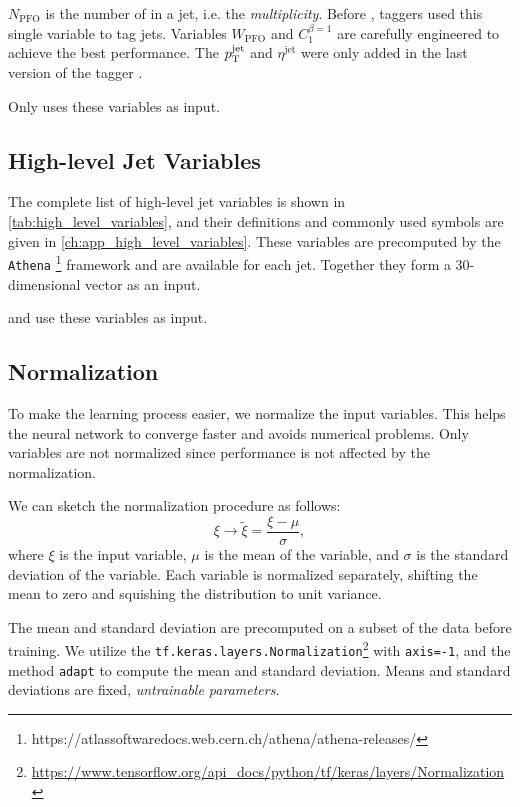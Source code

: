 $N_\mathrm{PFO}$ is the number of \PFOs in a jet, i.e. the \emph{multiplicity}.
Before \bdt, taggers used this single variable to tag jets. 
Variables $W_\mathrm{PFO}$ and $C_1^{\beta = 1}$ are carefully engineered to achieve the best performance.
The $p_\text{T}^{\text{jet}}$ and $\eta^\mathrm{jet}$ were only added in the last version of the tagger \cite{bdt_tag}.

Only \bdt uses these variables as input.

\subsection{High-level Jet Variables}
\label{sec:high_level_variables}

The complete list of high-level jet variables is shown in \cref{tab:high_level_variables}, and their definitions and commonly used symbols are given in \cref{ch:app_high_level_variables}.
These variables are precomputed by the \texttt{Athena} \footnote{https://atlassoftwaredocs.web.cern.ch/athena/athena-releases/} framework and are available for each jet.
Together they form a 30-dimensional vector as an input.

\fc and \highway use these variables as input.

\subsection{Normalization}
\label{sec:input_normalization}
To make the learning process easier, we normalize the input variables.
This helps the neural network to converge faster and avoids numerical problems.
Only \bdt variables are not normalized since \bdt performance is not affected by the normalization.

We can sketch the normalization procedure as follows:
\begin{equation}
    \xi \rightarrow \tilde{\xi} = \frac{\xi - \mu}{\sigma},
\end{equation}
where $\xi$ is the input variable, $\mu$ is the mean of the variable, and $\sigma$ is the standard deviation of the variable.
Each variable is normalized separately, shifting the mean to zero and squishing the distribution to unit variance.

The mean and standard deviation are precomputed on a subset of the data before training.
We utilize the \texttt{tf.keras.layers.Normalization}\footnote{\url{https://www.tensorflow.org/api_docs/python/tf/keras/layers/Normalization}} with \texttt{axis=-1}, and the method \texttt{adapt} to compute the mean and standard deviation.
Means and standard deviations are fixed, \emph{untrainable parameters}.


